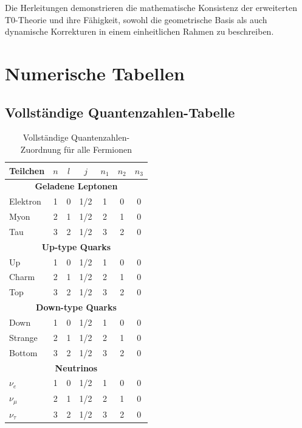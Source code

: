 	Die Herleitungen demonstrieren die mathematische Konsistenz der erweiterten T0-Theorie und ihre Fähigkeit, sowohl die geometrische Basis als auch dynamische Korrekturen in einem einheitlichen Rahmen zu beschreiben.
	
	\section{Numerische Tabellen}
	\label{app:tables}
	
	\subsection{Vollständige Quantenzahlen-Tabelle}
	
	\begin{table}[h]
		\centering
		\small
		\begin{tabular}{lcccccc}
			\toprule
			\textbf{Teilchen} & \textbf{$n$} & \textbf{$l$} & \textbf{$j$} & \textbf{$n_1$} & \textbf{$n_2$} & \textbf{$n_3$} \\
			\midrule
			\multicolumn{7}{c}{\textbf{Geladene Leptonen}} \\
			\midrule
			Elektron & 1 & 0 & 1/2 & 1 & 0 & 0 \\
			Myon & 2 & 1 & 1/2 & 2 & 1 & 0 \\
			Tau & 3 & 2 & 1/2 & 3 & 2 & 0 \\
			\midrule
			\multicolumn{7}{c}{\textbf{Up-type Quarks}} \\
			\midrule
			Up & 1 & 0 & 1/2 & 1 & 0 & 0 \\
			Charm & 2 & 1 & 1/2 & 2 & 1 & 0 \\
			Top & 3 & 2 & 1/2 & 3 & 2 & 0 \\
			\midrule
			\multicolumn{7}{c}{\textbf{Down-type Quarks}} \\
			\midrule
			Down & 1 & 0 & 1/2 & 1 & 0 & 0 \\
			Strange & 2 & 1 & 1/2 & 2 & 1 & 0 \\
			Bottom & 3 & 2 & 1/2 & 3 & 2 & 0 \\
			\midrule
			\multicolumn{7}{c}{\textbf{Neutrinos}} \\
			\midrule
			$\nu_e$ & 1 & 0 & 1/2 & 1 & 0 & 0 \\
			$\nu_\mu$ & 2 & 1 & 1/2 & 2 & 1 & 0 \\
			$\nu_\tau$ & 3 & 2 & 1/2 & 3 & 2 & 0 \\
			\bottomrule
		\end{tabular}
		\caption{Vollständige Quantenzahlen-Zuordnung für alle Fermionen}
		\label{tab:all_quantum_numbers}
	\end{table}
	
